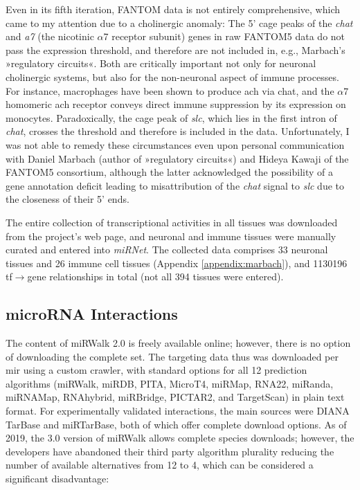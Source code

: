 Even in its fifth iteration, FANTOM data is not entirely comprehensive, which came to my attention due to a cholinergic anomaly: The 5' \ac{cage} peaks of the \textit{\ac{chat}} and \textit{\acs{a7}} (the nicotinic $\alpha$7 receptor subunit) genes in raw FANTOM5 data do not pass the expression threshold, and therefore are not included in, e.g., Marbach's »regulatory circuits«. Both are critically important not only for neuronal cholinergic systems, but also for the non-neuronal aspect of immune processes. For instance, macrophages have been shown to produce \ac{ach} via \ac{chat}, and the $\alpha$7 homomeric \ac{ach} receptor conveys direct immune suppression by its expression on monocytes\cite{Fujii2017}. Paradoxically, the \ac{cage} peak of \textit{\ac{slc}}, which lies in the first intron of \textit{\ac{chat}}, crosses the threshold and therefore is included in the data. Unfortunately, I was not able to remedy these circumstances even upon personal communication with Daniel Marbach (author of »regulatory circuits«) and Hideya Kawaji of the FANTOM5 consortium, although the latter acknowledged the possibility of a gene annotation deficit leading to misattribution of the \textit{\ac{chat}} signal to \textit{\ac{slc}} due to the closeness of their 5' ends.

The entire collection of transcriptional activities in all tissues was downloaded from the project's web page\cite{Marbach2016}, and neuronal and immune tissues were manually curated and entered into \textit{miRNet}. The collected data comprises 33 neuronal tissues and 26 immune cell tissues (Appendix \ref{appendix:marbach}), and \num{1130196} \ac{tf}$\to$gene relationships in total (not all 394 tissues were entered). 

\subsection{microRNA Interactions} \label{sec:database:mirna}
The content of miRWalk 2.0 is freely available online\cite{miRWalk2}; however, there is no option of downloading the complete set. The targeting data thus was downloaded per \ac{mir} using a custom crawler, with standard options for all 12 prediction algorithms (miRWalk, miRDB, PITA, MicroT4, miRMap, RNA22, miRanda, miRNAMap, RNAhybrid, miRBridge, PICTAR2, and TargetScan) in plain text format. For experimentally validated interactions, the main sources were DIANA TarBase\cite{Karagkouni2018} and miRTarBase\cite{Chou2018}, both of which offer complete download options. As of 2019, the 3.0 version of miRWalk allows complete species downloads; however, the developers have abandoned their third party algorithm plurality reducing the number of available alternatives from 12 to 4, which can be considered a significant disadvantage:

